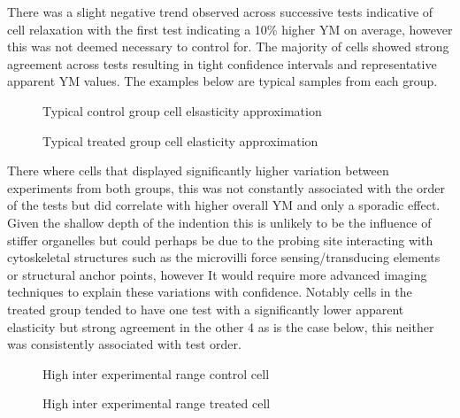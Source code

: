\documentclass[
  paper=a4,
  ,captions=tableheading
]{scrartcl}
\makeatletter
\newcommand*\pandocbounded[1]{%
  \sbox\pandoc@box{#1}%
  \Gscale@div\@tempa{\textheight}{\dimexpr\ht\pandoc@box+\dp\pandoc@box\relax}%
  \Gscale@div\@tempb{\linewidth}{\wd\pandoc@box}%
  \ifdim\@tempb\p@<\@tempa\p@\let\@tempa\@tempb\fi%
  \ifdim\@tempa\p@<\p@\scalebox{\@tempa}{\usebox\pandoc@box}%
  \else\usebox{\pandoc@box}%
  \fi%
}
\makeatother
\begin{document}
There was a slight negative trend observed across successive tests
indicative of cell relaxation with the first test indicating a 10\%
higher YM on average, however this was not deemed necessary to control
for. The majority of cells showed strong agreement across tests
resulting in tight confidence intervals and representative apparent YM
values. The examples below are typical samples from each group.

\noindent
\begin{minipage}[t]{0.48\textwidth}
\begin{figure}
\centering
\pandocbounded{}
\caption{Typical control group cell elsasticity approximation}
\end{figure}
\end{minipage}
\hfill
\begin{minipage}[t]{0.48\textwidth}
\begin{figure}
\centering
\pandocbounded{}
\caption{Typical treated group cell elasticity approximation}
\end{figure}
\end{minipage}

There where cells that displayed significantly higher variation between
experiments from both groups, this was not constantly associated with
the order of the tests but did correlate with higher overall YM and only
a sporadic effect. Given the shallow depth of the indention this is
unlikely to be the influence of stiffer organelles but could perhaps be
due to the probing site interacting with cytoskeletal structures such as
the microvilli force sensing/transducing elements or structural anchor
points, however It would require more advanced imaging techniques to
explain these variations with confidence. Notably cells in the treated
group tended to have one test with a significantly lower apparent
elasticity but strong agreement in the other 4 as is the case below,
this neither was consistently associated with test order.

\noindent
\begin{minipage}[t]{0.48\textwidth}
\begin{figure}
\centering
\pandocbounded{}
\caption{High inter experimental range control cell}
\end{figure}
\end{minipage}
\hfill
\begin{minipage}[t]{0.48\textwidth}
\begin{figure}
\centering
\pandocbounded{}
\caption{High inter experimental range treated cell}
\end{figure}
\end{minipage}
\end{document}
